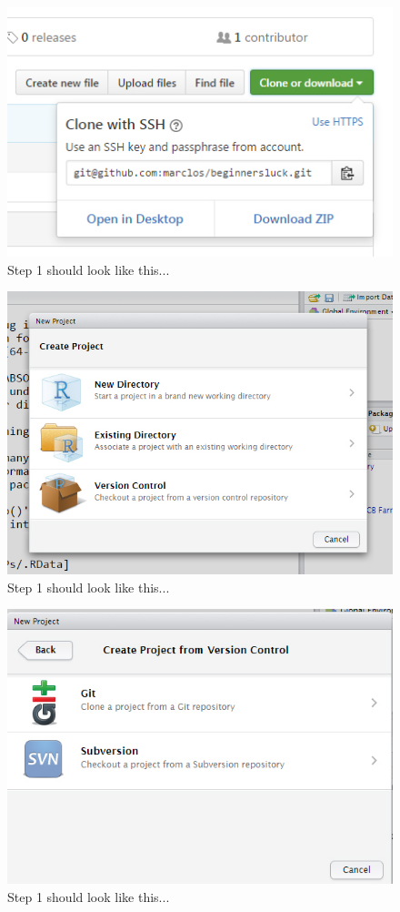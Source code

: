 \documentclass[12pt]{../SOP3_beta}
\begin{document}
\begin{figure}
\includegraphics{graphics/CloningGithub2.jpg}
\caption{Step 1 should look like this...}
\end{figure}

\begin{figure}
\includegraphics{graphics/RstudioNewProject.jpg}
\caption{Step 1 should look like this...}
\end{figure}


\begin{figure}
\includegraphics{graphics/RstudioNewProject2.jpg}
\caption{Step 1 should look like this...}
\end{figure}
\end{document}
